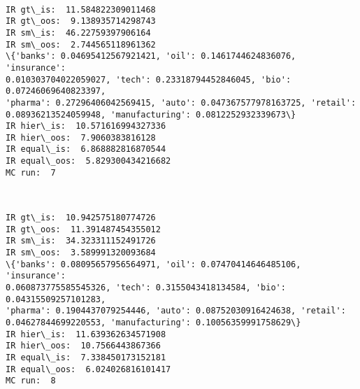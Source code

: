 \documentclass[11pt]{article}
\begin{document}
    \begin{center}
    \end{center}
    { \hspace*{\fill} \\}
    
    \begin{Verbatim}[commandchars=\\\{\},fontsize=\footnotesize]
IR gt\_is:  11.584822309011468
IR gt\_oos:  9.138935714298743
IR sm\_is:  46.22759397906164
IR sm\_oos:  2.744565118961362
\{'banks': 0.04695412567921421, 'oil': 0.1461744624836076, 'insurance':
0.010303704022059027, 'tech': 0.23318794452846045, 'bio': 0.07246069640823397,
'pharma': 0.27296406042569415, 'auto': 0.047367577978163725, 'retail':
0.08936213524059948, 'manufacturing': 0.0812252932339673\}
IR hier\_is:  10.571616994327336
IR hier\_oos:  7.9060383816128
IR equal\_is:  6.868882816870544
IR equal\_oos:  5.829300434216682
MC run:  7

    \end{Verbatim}

    \begin{center}
    \end{center}
    { \hspace*{\fill} \\}
    
    \begin{Verbatim}[commandchars=\\\{\},fontsize=\footnotesize]
IR gt\_is:  10.942575180774726
IR gt\_oos:  11.391487454355012
IR sm\_is:  34.323311152491726
IR sm\_oos:  3.589991320093684
\{'banks': 0.08095657956564971, 'oil': 0.07470414646485106, 'insurance':
0.060873775585545326, 'tech': 0.3155043418134584, 'bio': 0.04315509257101283,
'pharma': 0.1904437079254446, 'auto': 0.08752030916424638, 'retail':
0.04627844699220553, 'manufacturing': 0.10056359991758629\}
IR hier\_is:  11.639362634571908
IR hier\_oos:  10.7566443867366
IR equal\_is:  7.338450173152181
IR equal\_oos:  6.024026816101417
MC run:  8

    \end{Verbatim}

    \begin{center}
    \end{center}
    { \hspace*{\fill} \\}
    
\end{document}
